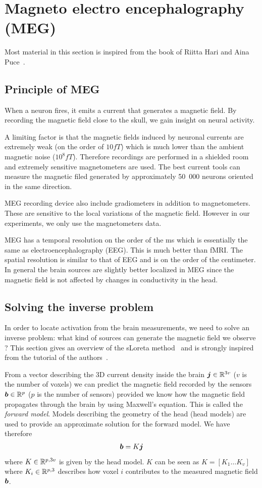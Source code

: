 \section{Magneto electro encephalography (MEG)}
Most material in this section is inspired from the book of Riitta Hari and Aina
Puce~\cite{hari2017meg}.

\subsection{Principle of MEG}
When a neuron fires, it emits a current that generates a magnetic field. By
recording the magnetic field close to the skull, we gain insight on neural
activity.

A limiting factor is that the magnetic fields induced by neuronal currents are
extremely weak (on the order of $10 fT$) which is much lower than the ambient magnetic noise ($10^8 fT$). Therefore recordings are performed in a shielded room and extremely sensitive magnetometers are used.
The best current tools can measure the magnetic filed generated by approximately 50~000 neurons oriented in the same direction.

MEG recording device also include gradiometers in addition to magnetometers.
These are sensitive to the local variations of the magnetic field. However in our experiments, we only use the magnetometers data.

MEG has a temporal resolution on the order of the ms which is essentially the same as electroencephalography (EEG). This is much better than fMRI. The spatial
resolution is similar to that of EEG and is on the order of the centimeter.
In general the brain sources are slightly better localized in MEG since the
magnetic field is not affected by changes in conductivity in the head.


\subsection{Solving the inverse problem}
In order to locate activation from the brain measurements, we need to solve an inverse problem: what kind of sources can generate the magnetic field we
observe ? This section gives an overview of the sLoreta
method~\cite{pascual2002standardized} and is strongly inspired from the tutorial
of the authors~\cite{pascual2007discrete}.

From a vector describing the 3D current density inside the brain $\boldsymbol{j} \in \mathbb{R}^{3v}$
($v$ is the number of voxels) we
can predict the magnetic field recorded by the sensors $\boldsymbol{b} \in \mathbb{R}^p$ ($p$ is the number of sensors) provided
we know how the magnetic field propagates through the brain by using Maxwell's
equation. This is called the \emph{forward model}. Models describing the
geometry of the head (head models) are used to provide an approximate solution for the forward model.
We have therefore
\begin{align}
  \boldsymbol{b} = K \boldsymbol{j}
  \label{eq:maxwell}
\end{align}
where $K \in \mathbb{R}^{p, 3v}$ is given by the head model.
$K$ can be seen as $K  = [K_1 \dots K_{v}]$ where $K_i \in \mathbb{R}^{p, 3}$ describes how voxel $i$ contributes to the measured magnetic field $\boldsymbol{b}$.

